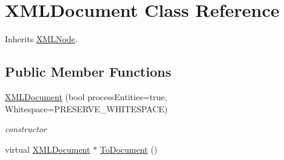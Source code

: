\hypertarget{classtinyxml2_1_1_x_m_l_document}{\section{X\-M\-L\-Document Class Reference}
\label{classtinyxml2_1_1_x_m_l_document}
}


Inherits \hyperlink{classtinyxml2_1_1_x_m_l_node}{X\-M\-L\-Node}.

\subsection*{Public Member Functions}
\begin{DoxyCompactItemize}
\item 
\hypertarget{classtinyxml2_1_1_x_m_l_document_a92e78f00a8208c46f4da948c05a2a7e8}{\hyperlink{classtinyxml2_1_1_x_m_l_document_a92e78f00a8208c46f4da948c05a2a7e8}{X\-M\-L\-Document} (bool process\-Entities=true, Whitespace=P\-R\-E\-S\-E\-R\-V\-E\-\_\-\-W\-H\-I\-T\-E\-S\-P\-A\-C\-E)}\label{classtinyxml2_1_1_x_m_l_document_a92e78f00a8208c46f4da948c05a2a7e8}

\begin{DoxyCompactList}\small\item\em constructor \end{DoxyCompactList}\item 
\hypertarget{classtinyxml2_1_1_x_m_l_document_ad545679e72ed7e85de208ecad69ba377}{virtual \hyperlink{classtinyxml2_1_1_x_m_l_document}{X\-M\-L\-Document} $\ast$ \hyperlink{classtinyxml2_1_1_x_m_l_document_ad545679e72ed7e85de208ecad69ba377}{To\-Document} ()}\label{classtinyxml2_1_1_x_m_l_document_ad545679e72ed7e85de208ecad69ba377}


\end{DoxyCompactItemize}
